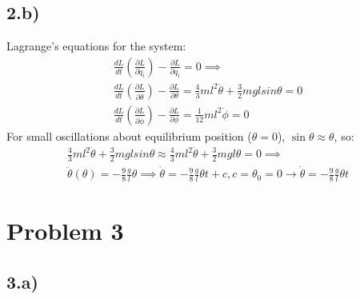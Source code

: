 \documentclass[11pt,a4paper]{report}
\begin{document}
\subsection*{2.b)}
Lagrange's equations for the system:
\begin{align*}
\frac{dL}{dt}(\frac{\partial L }{\partial \dot{q}_i})-\frac{\partial L}{\partial q_i}=0 \implies \\
\frac{dL}{dt}(\frac{\partial L }{\partial \dot{\theta}})-\frac{\partial L}{\partial \theta}=\frac{4}{3}ml^2\ddot{\theta}+\frac{3}{2}mgl sin \theta=0\\
\frac{dL}{dt}(\frac{\partial L }{\partial \dot{\phi}})-\frac{\partial L}{\partial \phi}=\frac{1}{12}ml^2\ddot{\phi}=0
\end{align*}
For small oscillations about equilibrium position ($\theta=0$), $\sin \theta\approx\theta$, so:
\begin{align*}
\frac{4}{3}ml^2\ddot{\theta}+\frac{3}{2}mgl sin \theta\approx\frac{4}{3}ml^2\ddot{\theta}+\frac{3}{2}mgl \theta = 0 \implies \\
\ddot{\theta}(\theta)=-\frac{9}{8}\frac{g}{l} \theta  \implies \dot{\theta}=-\frac{9}{8}\frac{g}{l} \theta t+c, c=\theta_0=0 \rightarrow \dot{\theta}=-\frac{9}{8}\frac{g}{l} \theta t
\end{align*}

\section*{Problem 3}
\subsection*{3.a)}

\end{document}
